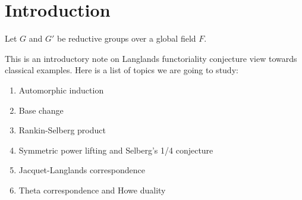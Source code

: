 \chapter{Introduction}

\begin{conjecture} Let $G$ and $G'$ be reductive groups over a global field $F$. 
\end{conjecture}
This is an introductory note on Langlands functoriality conjecture view towards classical examples. Here is a list of topics we are going to study:

\begin{enumerate}
    \item Automorphic induction
    \item Base change
    \item Rankin-Selberg product
    \item Symmetric power lifting and Selberg's 1/4 conjecture
    \item Jacquet-Langlands correspondence
    \item Theta correspondence and Howe duality
\end{enumerate}